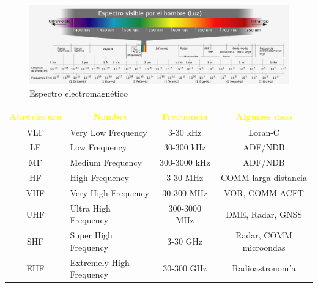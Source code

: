 \begin{landscape}


\begin{figure}[!h]
  \centering
 \includegraphics[width=\textheight]{06.radionavegacion/Imagenes/06.01.adf/electromagneticspectrumes.eps}   
  \caption{Espectro electromagn\'etico}
  \label{fig:espectro-electromagnetico}
\end{figure}

  \begin{minipage}[c]{0.50\textheight}
    \centering 
    \label{tab:espectro-radioelectrico}

    \begin{adjustbox}{width = 0.9\linewidth}
      \begin{tabular}{|c|l|c|c|}
        \hline \rowcolor{blue!50!black}
        \textcolor{yellow}{\bf Abreviatura} & \multicolumn{1}{c}{\textcolor{yellow}{\bf  Nombre}}
        & \textcolor{yellow}{\bf Frecuencia} & \textcolor{yellow}{\bf Algunos usos}\\ \hline \hline
        VLF 	& Very Low Frequency& 	3-30 kHz &	Loran-C \\ \hline
        LF 	&Low Frequency 	&30-300 kHz &	ADF/NDB \\ \hline
        MF 	&Medium Frequency 	&300-3000 kHz 	&ADF/NDB \\ \hline
        HF 	&High Frequency 	&3-30 MHz 	&COMM larga distancia \\ \hline
        VHF 	&Very High Frequency 	&30-300 MHz 	&VOR, COMM ACFT \\ \hline
        UHF 	&Ultra High Frequency 	&300-3000 MHz 	&DME, Radar, GNSS \\ \hline
        SHF 	&Super High Frequency 	&3-30 GHz 	&Radar, COMM microondas \\ \hline
        EHF 	&Extremely High Frequency &30-300 GHz 	&Radioastronom\'ia \\ \hline
      \end{tabular}  
    \end{adjustbox}


\end{minipage}
\end{landscape}
